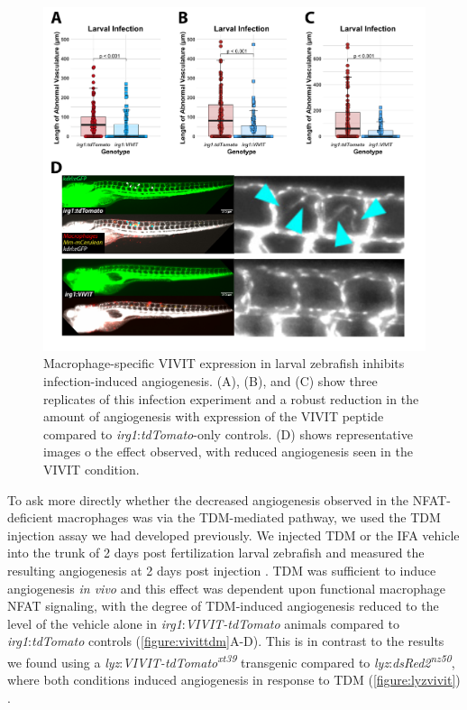 \begin{figure}
\centering
\includegraphics[width=\textwidth]{images/vivitlinf.pdf}
\caption{Macrophage\hyp{}specific VIVIT expression in larval zebrafish inhibits infection\hyp{}induced angiogenesis. (A), (B), and (C) show three replicates of this infection experiment and a robust reduction in the amount of angiogenesis with expression of the VIVIT peptide compared to \textit{irg1}:\textit{tdTomato}\hyp{}only controls. (D) shows representative images o the effect observed, with reduced angiogenesis seen in the VIVIT condition.}
\label{figure:vivitinf}
\end{figure}

To ask more directly whether the decreased angiogenesis observed in the NFAT\hyp{}deficient macrophages was via the TDM\hyp{}mediated pathway, we used the TDM injection assay we had developed previously. We injected TDM or the IFA vehicle into the trunk of 2 days post fertilization larval zebrafish and measured the resulting angiogenesis at 2 days post injection \citep{Walton2018}. TDM was sufficient to induce angiogenesis \textit{in vivo} and this effect was dependent upon functional macrophage NFAT signaling, with the degree of TDM\hyp{}induced angiogenesis reduced to the level of the vehicle alone in \textit{irg1}:\textit{VIVIT\hyp{}tdTomato} animals compared to \textit{irg1}:\textit{tdTomato} controls (\autoref{figure:vivittdm}A\hyp{}D). This is in contrast to the results we found using a \textit{lyz}:\textit{VIVIT\hyp{}tdTomato\textsuperscript{xt39}} transgenic compared to \textit{lyz}:\textit{dsRed2\textsuperscript{nz50}}, where both conditions induced angiogenesis in response to TDM (\autoref{figure:lyzvivit}) \citep{Hall2007}.

